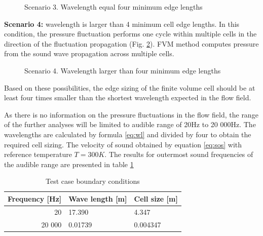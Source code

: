 \begin{figure}[h!]
\centering %
\caption{Scenario 3. Wavelength equal four minimum edge lengths}
\label{scen3}
\end{figure}

\textbf{Scenario 4:} wavelength is larger than 4 minimum cell edge lengths. In this condition, the pressure fluctuation performs one cycle within multiple cells in the direction of the fluctuation propagation (Fig. \ref{scen4}). FVM method computes pressure from the sound wave propagation across multiple cells.

\begin{figure}[h!]
\centering %
\caption{Scenario 4. Wavelength larger than four minimum edge lengths}
\label{scen4}
\end{figure}

Based on these possibilities, the edge sizing of the finite volume cell should be at least four times smaller than the shortest wavelength expected in the flow field.

As there is no information on the pressure fluctuations in the flow field, the range of the further analyses will be limited to audible range of 20Hz to 20 000Hz. The wavelengths are calculated by formula \ref{eq:wl} and divided by four to obtain the required cell sizing. The velocity of sound obtained by equation \ref{eq:sos} with reference temperature $T = 300K$. The results for outermost sound frequencies of the audible range are presented in table \ref{tab:meshsize}

\begin{table}[htb!]
\centering
\caption{Test case boundary conditions} \label{tab:meshsize}
\begin{tabular}{ | r | l | l | } \hline
Frequency [Hz] & Wave length [m] & Cell size [m] \\ \hline \hline
20 & 17.390 & 4.347  \\ \hline
20 000 & 0.01739 & 0.004347 \\ \hline
\end{tabular}
\end{table}

